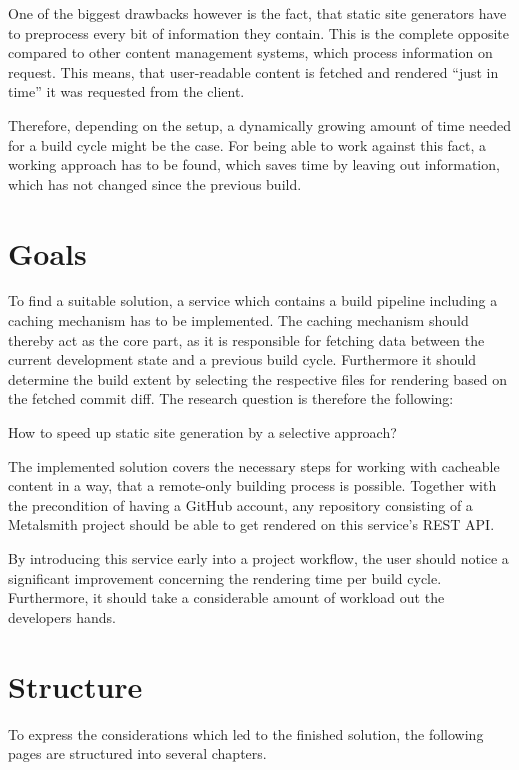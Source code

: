 One of the biggest drawbacks however is the fact, that static site generators have to preprocess every bit of information they contain. This is the complete opposite compared to other content management systems, which process information on request. This means, that user-readable content is fetched and rendered ``just in time'' it was requested from the client.

Therefore, depending on the setup, a dynamically growing amount of time needed for a build cycle might be the case. For being able to work against this fact, a working approach has to be found, which saves time by leaving out information, which has not changed since the previous build.

\section{Goals}
\label{sec:goals}
To find a suitable solution, a service which contains a build pipeline including a caching mechanism has to be implemented. The caching mechanism should thereby act as the core part, as it is responsible for fetching data between the current development state and a previous build cycle. Furthermore it should determine the build extent by selecting the respective files for rendering based on the fetched commit diff. The research question is therefore the following:

\begin{center}
  How to speed up static site generation by a selective approach?
\end{center}
The implemented solution covers the necessary steps for working with cacheable content in a way, that a remote-only building process is possible. Together with the precondition of having a GitHub account, any repository consisting of a Metalsmith project should be able to get rendered on this service's REST API.

By introducing this service early into a project workflow, the user should notice a significant improvement concerning the rendering time per build cycle. Furthermore, it should take a considerable amount of workload out the developers hands.

\section{Structure}
\label{sec:structure}
To express the considerations which led to the finished solution, the following pages are structured into several chapters.

